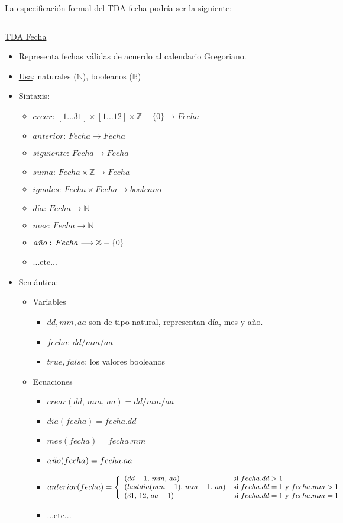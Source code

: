 \begin{example}
La especificación formal del TDA fecha podría ser la siguiente:

$ $\hskip-0.5cm \ttfamily

\underline{TDA Fecha}
\begin{itemize}
\item Representa fechas válidas de acuerdo al calendario Gregoriano.
\item \underline{Usa}: naturales ($\mathbb{N}$),  booleanos  ($\mathbb{B}$)
\item \underline{Sintaxis}:
\begin{itemize}
\item $crear:\, [1\dots 31]\times [1\dots 12] \times \mathbb{Z}-\{0\} \longrightarrow Fecha$
%	
\item $anterior:\, Fecha\longrightarrow Fecha$
%	
\item $siguiente:\, Fecha\longrightarrow Fecha$
%	
\item $suma:\, Fecha \times \mathbb{Z} \longrightarrow Fecha$
%
\item $iguales:\, Fecha \times Fecha \longrightarrow booleano$
%
\item $día:\, Fecha\longrightarrow \mathbb{N}$
%
\item $mes:\, Fecha\longrightarrow \mathbb{N}$
%
\item $a\mbox{\textit{ñ}}o:\, Fecha\longrightarrow \mathbb{Z}-\{0\}$
%	
\item ...etc...
\end{itemize}

\item \underline{Semántica}:
\begin{itemize}

\item Variables
\begin{itemize}
\item $dd, mm, aa$ son de tipo natural, representan día, mes y año.
\item $fecha$: $dd/mm/aa$
\item $true, false$: los valores booleanos
\end{itemize}


\item Ecuaciones
\begin{itemize}
\item $crear(dd,\, mm,\, aa)=dd/mm/aa$

\item $dia(fecha)=fecha.dd$
%
\item $mes(fecha)=fecha.mm$
%
\item $a\mbox{\textit{ñ}}o(fecha)=fecha.aa$
%
\item $anterior(fecha)=\small \left\{
\begin{array}{ll}
(dd-1,\, mm,\, aa) & \mbox{si } fecha.dd>1\\
(lastdia(mm-1),\, mm-1,\, aa) & \mbox{si } fecha.dd=1 \mbox{ y } fecha.mm >1\\
(31,\, 12,\, aa-1) & \mbox{si } fecha.dd=1 \mbox{ y } fecha.mm = 1
\end{array}
\right.
$
%	
\item ...etc...
\end{itemize}


\end{itemize}
\end{itemize}
\end{example}
